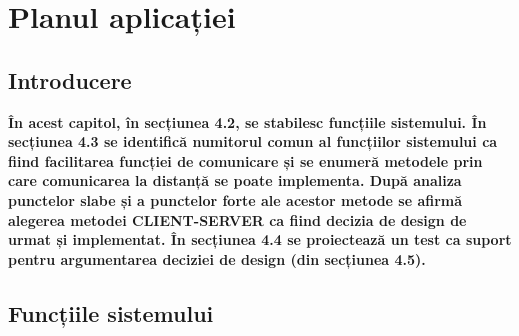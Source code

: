 \chapter{Planul aplicației}
\section{Introducere}
\par \textbf{În acest capitol, în secțiunea 4.2, se stabilesc funcțiile sistemului. În secțiunea 4.3 se identifică numitorul comun al funcțiilor sistemului ca fiind facilitarea funcției de \textsf{comunicare} și se  enumeră metodele prin care comunicarea la distanță se poate implementa. După analiza punctelor slabe și a punctelor forte ale acestor metode se afirmă alegerea metodei \textsf{CLIENT-SERVER} ca fiind decizia de design de urmat și implementat. În secțiunea 4.4 se proiectează un test ca suport pentru argumentarea deciziei de design (din secțiunea 4.5).}

\section{Funcțiile sistemului}


